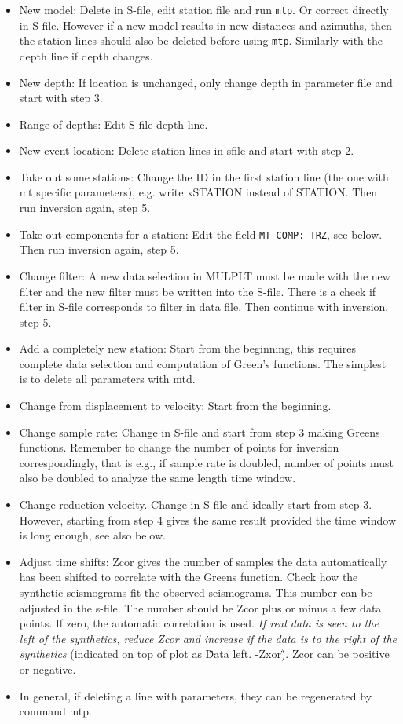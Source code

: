 \begin{itemize}
\item 
New model: Delete in S-file, edit station file and run \texttt{mtp}. Or correct directly in S-file. However if a new model results in new distances and azimuths, then the station lines should also be  deleted before using \texttt{mtp}. Similarly with the depth line if depth changes.
\item 
New depth: If location is unchanged, only change depth in parameter file and start with step 3.
\item 
Range of depths: Edit S-file depth line.
\item 
New event location: Delete station lines in sfile and start with step 2.
\item 
Take out some stations: Change the ID in the first station line (the one with mt specific parameters), e.g. write xSTATION instead of STATION. Then run inversion again, step 5.
\item 
Take out components for a station: Edit the field \texttt{MT-COMP: TRZ}, see below. Then run inversion again, step 5.
\item 
Change filter: A new data selection in MULPLT must be made with the new filter and the new filter must be written into the S-file. There is a check if filter in S-file corresponds to filter in data file. Then continue with inversion, step 5.
\item 
Add a completely new station: Start from the beginning, this requires complete data selection and computation of Green's functions. The simplest is to delete all parameters with mtd.
\item 
Change from displacement to velocity: Start from the beginning.
\item 
Change sample rate: Change in S-file and start from step 3 making Greens functions. Remember to change the number of points for inversion correspondingly, that is e.g., if sample rate is doubled, number of points must also be doubled to analyze the same length time window.
\item 
Change reduction velocity. Change in S-file and ideally start from step 3. However, starting from step 4 gives the same result provided the time window is long enough, see also below.
\item 
Adjust  time shifts:  Zcor gives the number of samples the data automatically has been shifted to correlate with the Greens function. Check how the synthetic seismograms fit the observed seismograms. This number can be adjusted in the s-file. The number should be Zcor plus or minus a few data points. If zero, the automatic correlation is used. \textit{If real data is seen to the left of the synthetics, reduce Zcor and increase if the data is to the right of the synthetics} (indicated on top of plot as \"Data left. -Zxor\"). Zcor can be positive or negative.
\item 
In general, if deleting a line with parameters, they can be regenerated by command mtp.
\end{itemize}

